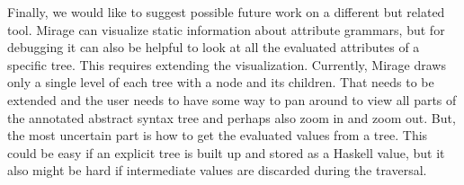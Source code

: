 \documentclass[11pt]{article}
\begin{document}
Finally, we would like to suggest possible future work on a different but related tool. Mirage can visualize static information about attribute grammars, but for debugging it can also be helpful to look at all the evaluated attributes of a specific tree. This requires extending the visualization. Currently, Mirage draws only a single level of each tree with a node and its children. That needs to be extended and the user needs to have some way to pan around to view all parts of the annotated abstract syntax tree and perhaps also zoom in and zoom out. But, the most uncertain part is how to get the evaluated values from a tree. This could be easy if an explicit tree is built up and stored as a Haskell value, but it also might be hard if intermediate values are discarded during the traversal.

\printbibliography
\end{document}
